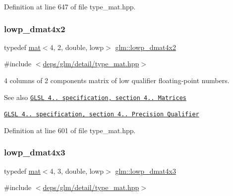 Definition at line 647 of file type\+\_\+mat.\+hpp.

\mbox{\label{group__core__precision_gaa61cd1362e63979d3e17d53957d2e17f}} 
\subsubsection{\texorpdfstring{lowp\+\_\+dmat4x2}{lowp\_dmat4x2}}
{\footnotesize\ttfamily typedef \hyperlink{structglm_1_1mat}{mat}$<$4, 2, double, lowp$>$ \hyperlink{group__core__precision_gaa61cd1362e63979d3e17d53957d2e17f}{glm\+::lowp\+\_\+dmat4x2}}



{\ttfamily \#include $<$\hyperlink{type__mat_8hpp}{deps/glm/detail/type\+\_\+mat.\+hpp}$>$}

4 columns of 2 components matrix of low qualifier floating-\/point numbers.

\begin{DoxySeeAlso}{See also}
\href{http://www.opengl.org/registry/doc/GLSLangSpec.4.20.8.pdf}{\tt G\+L\+SL 4.. specification, section 4.. Matrices} 

\href{http://www.opengl.org/registry/doc/GLSLangSpec.4.20.8.pdf}{\tt G\+L\+SL 4.. specification, section 4.. Precision Qualifier} 
\end{DoxySeeAlso}


Definition at line 601 of file type\+\_\+mat.\+hpp.

\mbox{\label{group__core__precision_gaf829f4341a7592475df926eb9b416dd4}} 
\subsubsection{\texorpdfstring{lowp\+\_\+dmat4x3}{lowp\_dmat4x3}}
{\footnotesize\ttfamily typedef \hyperlink{structglm_1_1mat}{mat}$<$4, 3, double, lowp$>$ \hyperlink{group__core__precision_gaf829f4341a7592475df926eb9b416dd4}{glm\+::lowp\+\_\+dmat4x3}}



{\ttfamily \#include $<$\hyperlink{type__mat_8hpp}{deps/glm/detail/type\+\_\+mat.\+hpp}$>$}

